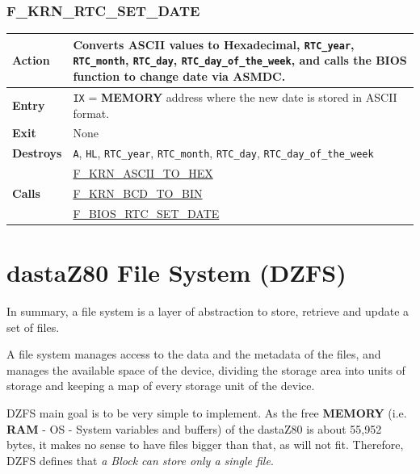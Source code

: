 \documentclass[a4paper,11pt]{article}
\begin{document}
        \subsubsection{F\_KRN\_RTC\_SET\_DATE}
        \label{func:fkrnrtcsetdate}
        \begin{tabular}{l p{9cm}}
            \hline\textbf{Action}
            & Converts ASCII values to Hexadecimal, \texttt{RTC\_year},
            \texttt{RTC\_month}, \texttt{RTC\_day}, \texttt{RTC\_day\_of\_the\_week},
            and calls the BIOS function to change date via \textbf{ASMDC}.\\
            \hline\textbf{Entry} & \texttt{IX} = \textbf{MEMORY} address where
            the new date is stored in ASCII format.\\
            \hline\textbf{Exit} & None \\
            \hline\textbf{Destroys} & \texttt{A}, \texttt{HL}, \texttt{RTC\_year},
            \texttt{RTC\_month}, \texttt{RTC\_day}, \texttt{RTC\_day\_of\_the\_week}\\
            \hline\multirow[t]{3}{4em}{\textbf{Calls}}
            & \hyperref[func:fkrnasciitohex]{F\_KRN\_ASCII\_TO\_HEX}\\
            & \hyperref[func:fkrnbcdtobin]{F\_KRN\_BCD\_TO\_BIN}\\
            & \hyperref[func:fbiosrtcsetdate]{F\_BIOS\_RTC\_SET\_DATE}\\
            \hline
        \end{tabular}

    \pagebreak
    \section{dastaZ80 File System (DZFS)}
    In summary, a file system is a layer of abstraction to store, retrieve and
    update a set of files.

    A file system manages access to the data and the metadata of the files, and
    manages the available space of the device, dividing the storage area into
    units of storage and keeping a map of every storage unit of the device.
    
    DZFS main goal is to be very simple to implement. As the free
    \textbf{MEMORY} (i.e. \textbf{RAM} - OS - System variables and buffers) of
    the dastaZ80 is about 55,952 bytes, it makes no sense to have files bigger
    than that, as will not fit. Therefore, DZFS defines that \textit{a Block can
    store only a single file}.
\end{document}
